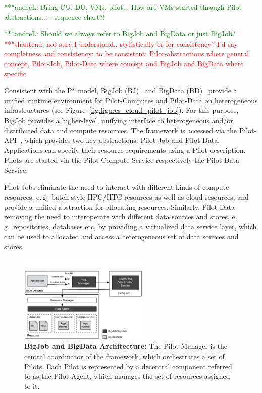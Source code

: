 \documentclass[times]{cpeauth}
\newcommand{\jhanote}[1]{ {\textcolor{red} { ***shantenu: #1 }}}
\newcommand{\alnote}[1]{ {\textcolor{green} { ***andreL: #1 }}}
\newcommand{\alnote}[1]{}
\newcommand{\jhanote}[1]{}
\newcommand{\pilot}{Pilot\xspace}
\newcommand{\pilots}{Pilots\xspace}
\newcommand{\pilotjob}{Pilot-Job\xspace}
\newcommand{\pilotjobs}{Pilot-Jobs\xspace}
\newcommand{\pilotcomputes}{Pilot-Computes\xspace}
\newcommand{\pilotdata}{Pilot-Data\xspace}
\newcommand{\pilotdataservice}{Pilot-Data Service\xspace}
\newcommand{\pilotcomputeservice}{Pilot-Compute Service\xspace}
\newcommand{\upp}{\vspace*{-0.5em}}
\begin{document}

\alnote{Bring CU, DU, VMs, pilot... How are VMs started through Pilot
  abstractions... - sequence chart?!}  


\alnote{Should we always refer to BigJob and BigData or just BigJob?}
\jhanote{not sure I understand.. stylistically or for consistency?
  I'd say completness and consistency: to be consistent:
  \pilot-abstractions where general concept, \pilotjob, \pilotdata
  where concept and BigJob and BigData where specific}

Consistent with the P* model, BigJob
(BJ)~\cite{saga_bigjob_condor_cloud} and BigData
(BD)~\cite{Mantha:2012:PEF:2287016.2287020} provide a unified runtime
environment for \pilotcomputes and \pilotdata on heterogeneous
infrastructures (see Figure~\ref{fig:figures_cloud_pilot_job}). For
this purpose, BigJob provides a higher-level, unifying interface to
heterogeneous and/or distributed data and compute resources. The
framework is accessed via the \pilot-API~\cite{pilot_api}, which
provides two key abstractions: \pilotjob and \pilotdata. Applications
can specify their resource requirements using a \pilot
description. \pilots are started via the \pilotcomputeservice
respectively the \pilotdataservice.

\pilotjobs eliminate the need to interact with different kinds of compute 
resources, e.\,g.\ batch-style HPC/HTC resources as well as cloud resources, 
and provide a unified abstraction for allocating resources. Similarly, 
\pilotdata removing the need to interoperate with different data sources and 
stores, e.\,g.\ repositories, databases etc, by providing a virtualized data 
service layer, which can be used to allocated and access a heterogeneous set 
of data sources and stores.

\begin{figure}
	\upp	\upp	\upp
	\centering
	\includegraphics[width=0.55\textwidth]{figures/bigjob-bigdata-architecture.pdf}
	\caption{\textbf{BigJob and BigData Architecture:} The \pilot-Manager is 
	the central coordinator of the framework, which orchestrates a set of 
	\pilots. Each \pilot is represented by a decentral component referred to 
	as the \pilot-Agent, which manages the set of resources assigned to it. }
	\label{fig:figures_bigjob-bigdata-architecture}
\end{figure}
\end{document}
